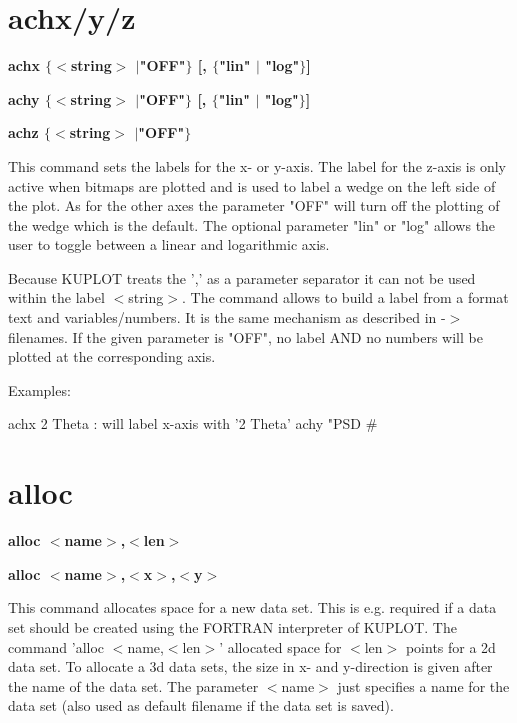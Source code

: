 \section{achx/y/z}
{\bf achx $ \{$$ <$string$> $ $| $"OFF"$\} $ [, $ \{$"lin" $| $ "log"$\} $] \par }
{\bf achy $ \{$$ <$string$> $ $| $"OFF"$\} $ [, $ \{$"lin" $| $ "log"$\} $] \par }
{\bf achz $ \{$$ <$string$> $ $| $"OFF"$\} $ \par }
\par
\vspace{3pt}
This command sets the labels for the x- or y-axis. The label for 
the z-axis is only active when bitmaps are plotted and is used 
to label a wedge on the left side of the plot. As for the other 
axes the parameter "OFF" will turn off the plotting of the 
wedge which is the default. The optional parameter "lin" or 
"log" allows the user to toggle between a linear and logarithmic 
axis. 
\par
Because KUPLOT treats the ',' as a parameter separator it can not 
be used within the label $ <$string$> $. The command allows to build a 
label from a format text and variables/numbers. It is the same 
mechanism as described in -$> $ filenames. If the given parameter is 
"OFF", no label AND no numbers will be plotted at the corresponding 
axis. 
\par
Examples: 
\par
\begin{MacVerbatim}
achx 2 Theta       : will label x-axis with '2 Theta'
achy "PSD #%
\end{MacVerbatim}
\section{alloc}
{\bf alloc $ <$name$> $,$ <$len$> $ \par }
{\bf alloc $ <$name$> $,$ <$x$> $,$ <$y$> $ \par }
\par
\vspace{3pt}
This command allocates space for a new data set. This is e.g. required 
if a data set should be created using the FORTRAN interpreter of 
KUPLOT. The command 'alloc $ <$name,$ <$len$> $' allocated space for $ <$len$> $ 
points for a 2d data set. To allocate a 3d data sets, the size in x- 
and y-direction is given after the name of the data set. The parameter 
$ <$name$> $ just specifies a name for the data set (also used as default 
filename if the data set is saved). 
